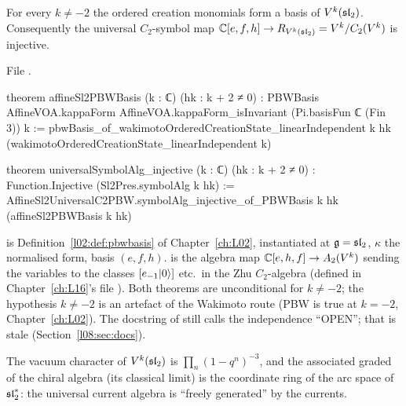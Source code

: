 \begin{theorem}\label{l08:thm:pbw}
For every $k\ne-2$ the ordered creation monomials form a basis of $V^k(\mathfrak{sl}_2)$. Consequently the
universal $C_2$-symbol map ${\mathbb{C}}[e,f,h]\to R_{V^k(\mathfrak{sl}_2)} = V^k/C_2(V^k)$ is injective.
\end{theorem}

\noindent File .
\begin{leancode}
theorem affineSl2PBWBasis (k : ℂ) (hk : k + 2 ≠ 0) :
    PBWBasis AffineVOA.kappaForm AffineVOA.kappaForm_isInvariant
      (Pi.basisFun ℂ (Fin 3)) k :=
  pbwBasis_of_wakimotoOrderedCreationState_linearIndependent k hk
    (wakimotoOrderedCreationState_linearIndependent k)

theorem universalSymbolAlg_injective (k : ℂ) (hk : k + 2 ≠ 0) :
    Function.Injective (Sl2Pres.symbolAlg k hk) :=
  AffineSl2UniversalC2PBW.symbolAlg_injective_of_PBWBasis k hk
    (affineSl2PBWBasis k hk)
\end{leancode}

\begin{dictionary}
 is Definition~\ref{l02:def:pbwbasis} of Chapter~\ref{ch:L02}, instantiated at
$\mathfrak g=\mathfrak{sl}_2$, $\kappa$ the normalised form, basis $(e,f,h)$.  is the
algebra map ${\mathbb{C}}[e,h,f]\to A_2(V^k)$ sending the variables to the classes $[e_{-1}|0\rangle]$ etc.\ in the
Zhu $C_2$-algebra (defined in Chapter~\ref{ch:L16}'s file ). Both
theorems are unconditional for $k\ne-2$; the hypothesis $k\ne-2$ is an artefact of the Wakimoto route
(PBW is true at $k=-2$, Chapter~\ref{ch:L02}). The docstring of 
still calls the independence ``OPEN''; that is stale (Section~\ref{l08:sec:docs}).
\end{dictionary}

\begin{physics}
The vacuum character of $V^k(\mathfrak{sl}_2)$ is $\prod_n(1-q^n)^{-3}$, and the associated graded of the
chiral algebra (its classical limit) is the coordinate ring of the arc space of $\mathfrak{sl}_2^*$: the
universal current algebra is ``freely generated'' by the currents.
\end{physics}

